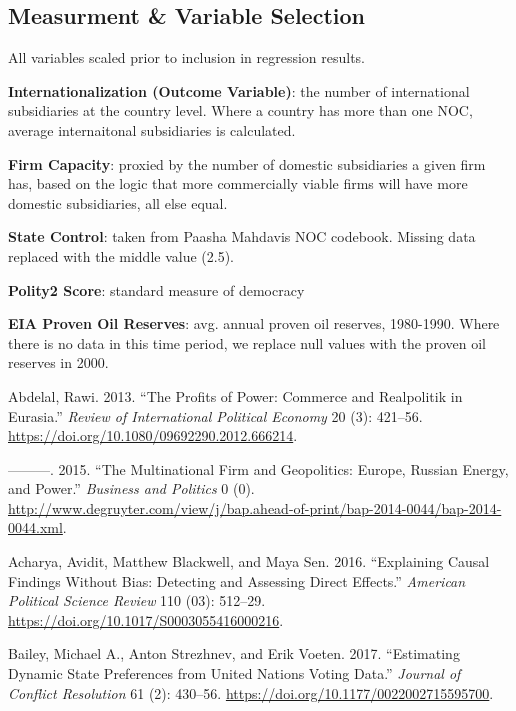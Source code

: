 \documentclass[11pt,]{book}
\begin{document}
\hypertarget{measurment-variable-selection}{%
\subsection{Measurment \& Variable Selection}\label{measurment-variable-selection}}

All variables scaled prior to inclusion in regression results.

\textbf{Internationalization (Outcome Variable)}: the number of international subsidiaries at the country level. Where a country has more than one NOC, average internaitonal subsidiaries is calculated.

\textbf{Firm Capacity}: proxied by the number of domestic subsidiaries a given firm has, based on the logic that more commercially viable firms will have more domestic subsidiaries, all else equal.

\textbf{State Control}: taken from Paasha Mahdavis NOC codebook. Missing data replaced with the middle value (2.5).

\textbf{Polity2 Score}: standard measure of democracy

\textbf{EIA Proven Oil Reserves}: avg. annual proven oil reserves, 1980-1990. Where there is no data in this time period, we replace null values with the proven oil reserves in 2000.

\hypertarget{refs}{}
\leavevmode\hypertarget{ref-abdelal_profits_2013}{}%
Abdelal, Rawi. 2013. ``The Profits of Power: Commerce and Realpolitik in Eurasia.'' \emph{Review of International Political Economy} 20 (3): 421--56. \url{https://doi.org/10.1080/09692290.2012.666214}.

\leavevmode\hypertarget{ref-abdelal_multinational_2015}{}%
---------. 2015. ``The Multinational Firm and Geopolitics: Europe, Russian Energy, and Power.'' \emph{Business and Politics} 0 (0). \url{http://www.degruyter.com/view/j/bap.ahead-of-print/bap-2014-0044/bap-2014-0044.xml}.

\leavevmode\hypertarget{ref-acharya_explaining_2016}{}%
Acharya, Avidit, Matthew Blackwell, and Maya Sen. 2016. ``Explaining Causal Findings Without Bias: Detecting and Assessing Direct Effects.'' \emph{American Political Science Review} 110 (03): 512--29. \url{https://doi.org/10.1017/S0003055416000216}.

\leavevmode\hypertarget{ref-bailey_estimating_2017}{}%
Bailey, Michael A., Anton Strezhnev, and Erik Voeten. 2017. ``Estimating Dynamic State Preferences from United Nations Voting Data.'' \emph{Journal of Conflict Resolution} 61 (2): 430--56. \url{https://doi.org/10.1177/0022002715595700}.
\end{document}
